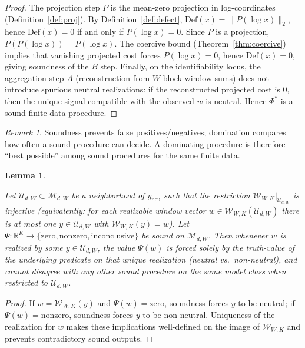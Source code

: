\documentclass[11pt,reqno]{amsart}
\newtheorem{lemma}[theorem]{Lemma}
\theoremstyle{definition}
\theoremstyle{remark}
\newtheorem{remark}[theorem]{Remark} %
\newcommand{\R}{\mathbb{R}}
\newcommand{\1}{\mathbf{1}}
\newcommand{\zero}{\mathrm{zero}}
\newcommand{\nonzero}{\mathrm{nonzero}}
\newcommand{\inconclusive}{\mathrm{inconclusive}}
\begin{document}
\begin{proof}
The projection step $P$ is the mean-zero projection in log-coordinates (Definition~\ref{def:proj}).
By Definition~\ref{def:defect}, $\mathrm{Def}(x)=\|P(\log x)\|_2$, hence $\mathrm{Def}(x)=0$ if and only if $P(\log x)=0$.
Since $P$ is a projection, $P(P(\log x))=P(\log x)$. The coercive bound (Theorem~\ref{thm:coercive})
implies that vanishing projected cost forces $P(\log x)=0$, hence $\mathrm{Def}(x)=0$, giving soundness of the $B$ step.
Finally, on the identifiability locus, the aggregation step $A$ (reconstruction from $W$-block window sums)
does not introduce spurious neutral realizations: if the reconstructed projected cost is $0$, then the unique
signal compatible with the observed $w$ is neutral. Hence $\Phi^\ast$ is a sound finite-data procedure.
\end{proof}

\begin{remark}\label{rem:domination-intuition}
Soundness prevents false positives/negatives; domination compares how often a sound procedure can decide.
A dominating procedure is therefore ``best possible'' among sound procedures for the same finite data.
\end{remark}


\begin{lemma}\label{lem:sound-factors}

Let $\mathcal{U}_{d,W}\subset\mathcal{M}_{d,W}$ be a neighborhood of $y_{\mathrm{neu}}$ such that the restriction
$\mathcal{W}_{W,K}\vert_{\mathcal{U}_{d,W}}$ is injective (equivalently: for each realizable window vector
$w\in\mathcal{W}_{W,K}(\mathcal{U}_{d,W})$ there is at most one $y\in\mathcal{U}_{d,W}$ with $\mathcal{W}_{W,K}(y)=w$).
Let $\Psi:\R^K\to\{\zero,\nonzero,\inconclusive\}$ be sound on $\mathcal{M}_{d,W}$.
Then whenever $w$ is realized by some $y\in\mathcal{U}_{d,W}$, the value $\Psi(w)$ is forced solely by the
truth-value of the underlying predicate on that unique realization (neutral vs.\ non-neutral), and cannot
disagree with any other sound procedure on the same model class when restricted to $\mathcal{U}_{d,W}$.

\end{lemma}

\begin{proof}
If $w=\mathcal{W}_{W,K}(y)$ and $\Psi(w)=\zero$, soundness forces $y$ to be neutral; if $\Psi(w)=\nonzero$,
soundness forces $y$ to be non-neutral. Uniqueness of the realization for $w$ makes these implications
well-defined on the image of $\mathcal{W}_{W,K}$ and prevents contradictory sound outputs.
\end{proof}
\end{document}

